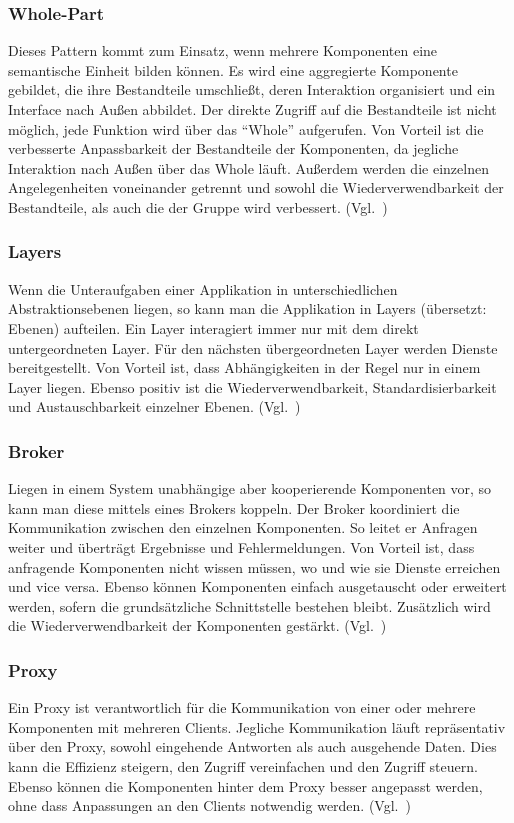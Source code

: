 \subsubsection{Whole-Part}
Dieses Pattern kommt zum Einsatz, wenn mehrere Komponenten eine semantische Einheit bilden können.
Es wird eine aggregierte Komponente gebildet, die ihre Bestandteile umschließt, deren Interaktion organisiert und ein Interface nach Außen abbildet.
Der direkte Zugriff auf die Bestandteile ist nicht möglich, jede Funktion wird über das \enquote{Whole} aufgerufen.
Von Vorteil ist die verbesserte Anpassbarkeit der Bestandteile der Komponenten, da jegliche Interaktion nach Außen über das Whole läuft.
Außerdem werden die einzelnen Angelegenheiten voneinander getrennt und sowohl die Wiederverwendbarkeit der Bestandteile, als auch die der Gruppe wird verbessert.
(Vgl.~\cite{buschmann-pattern-oriented-software-architecture})

\subsubsection{Layers}
Wenn die Unteraufgaben einer Applikation in unterschiedlichen Abstraktionsebenen liegen, so kann man die Applikation in Layers (übersetzt: Ebenen) aufteilen.
Ein Layer interagiert immer nur mit dem direkt untergeordneten Layer.
Für den nächsten übergeordneten Layer werden Dienste bereitgestellt.
Von Vorteil ist, dass Abhängigkeiten in der Regel nur in einem Layer liegen.
Ebenso positiv ist die Wiederverwendbarkeit, Standardisierbarkeit und Austauschbarkeit einzelner Ebenen.
(Vgl.~\cite{buschmann-pattern-oriented-software-architecture})

\subsubsection{Broker}
Liegen in einem System unabhängige aber kooperierende Komponenten vor, so kann man diese mittels eines Brokers koppeln.
Der Broker koordiniert die Kommunikation zwischen den einzelnen Komponenten.
So leitet er Anfragen weiter und überträgt Ergebnisse und Fehlermeldungen.
Von Vorteil ist, dass anfragende Komponenten nicht wissen müssen, wo und wie sie Dienste erreichen und vice versa.
Ebenso können Komponenten einfach ausgetauscht oder erweitert werden, sofern die grundsätzliche Schnittstelle bestehen bleibt.
Zusätzlich wird die Wiederverwendbarkeit der Komponenten gestärkt.
(Vgl.~\cite{buschmann-pattern-oriented-software-architecture})

\subsubsection{Proxy}
Ein Proxy ist verantwortlich für die Kommunikation von einer oder mehrere Komponenten mit mehreren Clients.
Jegliche Kommunikation läuft repräsentativ über den Proxy, sowohl eingehende Antworten als auch ausgehende Daten.
Dies kann die Effizienz steigern, den Zugriff vereinfachen und den Zugriff steuern.
Ebenso können die Komponenten hinter dem Proxy besser angepasst werden, ohne dass Anpassungen an den Clients notwendig werden.
(Vgl.~\cite{buschmann-pattern-oriented-software-architecture})

